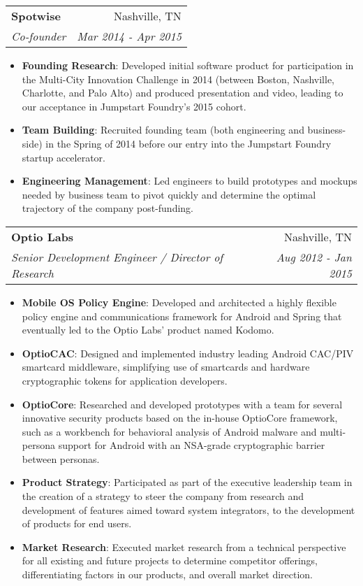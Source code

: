 \documentclass[letterpaper,10pt]{article}
\makeatletter
\newcommand{\resumeItem}[2]{
  \item\small{
    \textbf{#1}{: #2 \vspace{-2pt}}
  }
}
\newcommand{\resumeSubheading}[4]{
  \vspace{-1pt}\item
    \begin{tabular*}{0.97\textwidth}[t]{l@{\extracolsep{\fill}}r}
      \textbf{#1} & #2 \\
      \textit{\small#3} & \textit{\small #4} \\
    \end{tabular*}\vspace{-5pt}
}
\newcommand{\resumeItemListStart}{\begin{itemize}}
\newcommand{\resumeItemListEnd}{\end{itemize}\vspace{-5pt}}
\makeatother
\begin{document}
    \resumeSubheading
      {Spotwise}{Nashville, TN}
      {Co-founder}{Mar 2014 - Apr 2015}
      \resumeItemListStart
        \resumeItem{Founding Research}
          {Developed initial software product for participation in the Multi-City Innovation Challenge in 2014 (between Boston, Nashville, Charlotte, and Palo Alto) and produced presentation and video, leading to our acceptance in Jumpstart Foundry's 2015 cohort.}
        \resumeItem{Team Building}
          {Recruited founding team (both engineering and business-side) in the Spring of 2014 before our entry into the Jumpstart Foundry startup accelerator.}
        \resumeItem{Engineering Management}
          {Led engineers to build prototypes and mockups needed by business team to pivot quickly and determine the optimal trajectory of the company post-funding.}
      \resumeItemListEnd

    \resumeSubheading
      {Optio Labs}{Nashville, TN}
      {Senior Development Engineer / Director of Research}{Aug 2012 - Jan 2015}
      \resumeItemListStart
        \resumeItem{Mobile OS Policy Engine}
          {Developed and architected a highly flexible policy engine and communications framework for Android and Spring that eventually led to the Optio Labs’ product named Kodomo.}
        \resumeItem{OptioCAC}
          {Designed and implemented industry leading Android CAC/PIV smartcard middleware, simplifying use of smartcards and hardware cryptographic tokens for application developers.}
        \resumeItem{OptioCore}
          {Researched and developed prototypes with a team for several innovative security products based on the in-house OptioCore framework, such as a workbench for behavioral analysis of Android malware and multi-persona support for Android with an NSA-grade cryptographic barrier between personas.}
        \resumeItem{Product Strategy}
          {Participated as part of the executive leadership team in the creation of a strategy to steer the company from research and development of features aimed toward system integrators, to the development of products for end users.}
        \resumeItem{Market Research}
          {Executed market research from a technical perspective for all existing and future projects to determine competitor offerings, differentiating factors in our products, and overall market direction.}
      \resumeItemListEnd
      
      
\end{document}
